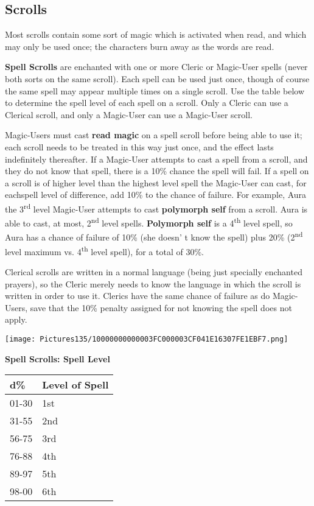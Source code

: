 \documentclass[a4paper,twoside,openany,10pt]{book}
\begin{document}
\begin{multicols}{2}
\subsection{Scrolls}\label{scrolls-1}

Most scrolls contain some sort of magic which is activated when read, and which may only be used once; the characters burn away as the words are read.

\textbf{Spell Scrolls} are enchanted with one or more Cleric or Magic-User spells (never both sorts on the same scroll). Each spell can be used just once, though of course the same spell may appear multiple times on a single scroll. Use the table below to determine the spell level of each spell on a scroll. Only a Cleric can use a Clerical scroll, and only a Magic-User can use a Magic-User scroll.

Magic-Users must cast \textbf{read magic} on a spell scroll before being able to use it; each scroll needs to be treated in this way just once, and the effect lasts indefinitely thereafter. If a Magic-User attempts to cast a spell from a scroll, and they do not know that spell, there is a 10\% chance the spell will fail. If a spell on a scroll is of higher level than the highest level spell the Magic-User can cast, for eachspell level of difference, add 10\% to the chance of failure. For example, Aura the 3\textsuperscript{rd} level Magic-User attempts to cast \textbf{polymorph self} from a scroll. Aura is able to cast, at most, 2\textsuperscript{nd} level spells. \textbf{Polymorph self} is a 4\textsuperscript{th} level spell, so Aura has a chance of failure of 10\% (she doesn' t know the spell) plus 20\% (2\textsuperscript{nd} level maximum vs. 4\textsuperscript{th} level spell), for a total of 30\%.

Clerical scrolls are written in a normal language (being just specially enchanted prayers), so the Cleric merely needs to know the language in which the scroll is written in order to use it. Clerics have the same chance of failure as do Magic-Users, save that the 10\% penalty assigned for not knowing the spell does not apply.

\begin{flushleft} \texttt{[image: Pictures135/10000000000003FC000003CF041E16307FE1EBF7.png]}  \end{flushleft}


\textbf{Spell Scrolls: Spell Level}

\begin{tabular*}{0.93\linewidth}{@{\extracolsep{\fill}}ll}
\textbf{d\%} & \textbf{Level of Spell} \\\toprule
01-30 & 1st \\\hline
31-55 & 2nd \\\hline
56-75 & 3rd \\\hline
76-88 & 4th \\\hline
89-97 & 5th \\\hline
98-00 & 6th \\\bottomrule
\end{tabular*}\medskip


\end{multicols}
\end{document}
